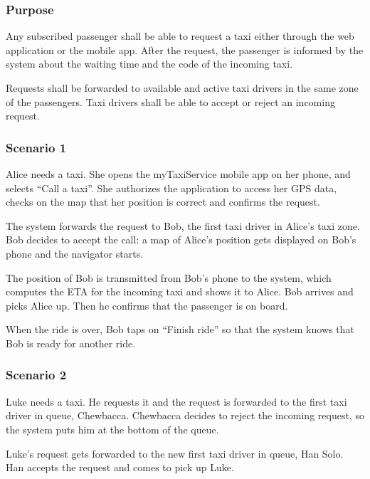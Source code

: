 \label{standard-call}
\subsubsection{Purpose}

Any subscribed passenger shall be able to request a taxi either through the web application or the mobile app.
After the request, the passenger is informed by the system about the waiting time and the code of the incoming taxi.

Requests shall be forwarded to available and active taxi drivers in the same zone of the passengers. Taxi drivers shall be able to accept or reject an incoming request.

\subsubsection{Scenario 1}
Alice needs a taxi. She opens the myTaxiService mobile app on her phone, and selects ``Call a taxi''. She authorizes the application to access her GPS data, checks on the map that her position is correct and confirms the request.

The system forwards the request to Bob, the first taxi driver in Alice's taxi zone. Bob decides to accept the call: a map of Alice's position gets displayed on Bob's phone and the navigator starts.

The position of Bob is transmitted from Bob's phone to the system, which computes the ETA for the incoming taxi and shows it to Alice. Bob arrives and picks Alice up. Then he confirms that the passenger is on board.

When the ride is over, Bob taps on ``Finish ride'' so that the system knows that Bob is ready for another ride.

\subsubsection{Scenario 2}
Luke needs a taxi. He requests it and the request is forwarded to the first taxi driver in queue, Chewbacca. Chewbacca decides to reject the incoming request, so the system puts him at the bottom of the queue.

Luke's request gets forwarded to the new first taxi driver in queue, Han Solo. Han accepts the request and comes to pick up Luke.

